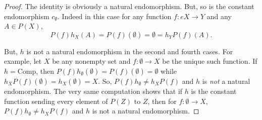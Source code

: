 \documentclass[main.tex]{subfiles}
\begin{document}
\begin{proof}
	The identity is obviously a natural endomorphism. But, so is the constant
	endomorphism $c_\emptyset$. Indeed in this case for any function
	$f\colon e X\to Y$ and any $A\in P(X)$,
	\[P(f)h_X(A)=P(f)(\emptyset)=\emptyset = h_YP(f)(A).\]

	But, $h$ is not a natural endomorphism in the second and fourth cases. For
	example, let $X$ be any nonempty set and $f\colon\emptyset\to X$ be the
	unique such function. If $h=\text{Comp}$, then
	$P(f)h_\emptyset(\emptyset)=P(f)(\emptyset)=\emptyset$ while
	$h_XP(f)(\emptyset)=h_X(\emptyset)=X$. So, $P(f)h_\emptyset\ne h_XP(f)$ and
	$h$ is \emph{not} a natural endomorphism. The very same computation shows
	that if $h$ is the constant function sending every element of $P(Z)$ to $Z$,
	then for $f\colon\emptyset\to X$, $P(f)h_\emptyset\ne h_XP(f)$ and $h$ is
	not a natural endomorphism.
\end{proof}
\end{document}
